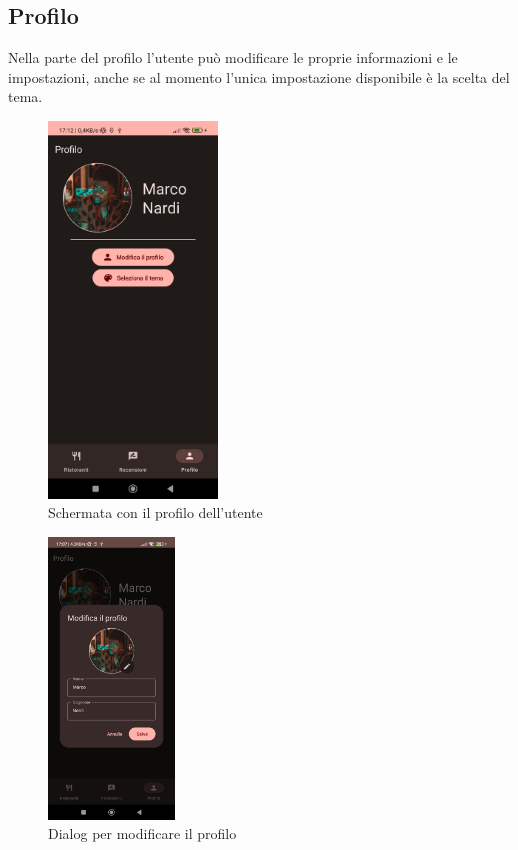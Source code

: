 \documentclass[12pt, a4paper]{report}
\begin{document}
	\newpage
	\subsection{Profilo}
		Nella parte del profilo l'utente può modificare le proprie informazioni e le impostazioni, anche se al momento l'unica impostazione disponibile è la scelta del tema.

		\begin{figure}[h]
			\centering
			\includegraphics[width=0.4\textwidth]{profileScreen.jpg} 
		  \caption{Schermata con il profilo dell'utente}
			
		\end{figure}
		\begin{figure}[h]
			\centering
			\includegraphics[width=0.3\textwidth]{editProfile.jpg} 
		  \caption{Dialog per modificare il profilo}
			
		\end{figure}
\end{document}
